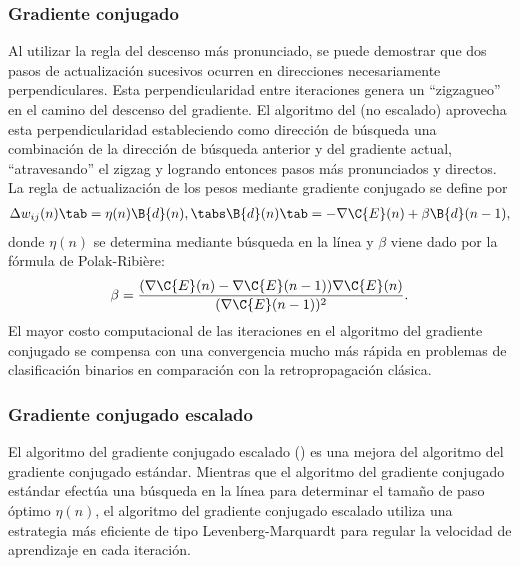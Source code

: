 \subsubsection{Gradiente conjugado}
%
Al utilizar la regla del descenso más pronunciado, se puede demostrar
que dos pasos de actualización sucesivos ocurren en direcciones
necesariamente perpendiculares.
Esta perpendicularidad entre iteraciones genera un ``zigzagueo'' en el
camino del descenso del gradiente. El algoritmo del  (no escalado) aprovecha esta perpendicularidad
estableciendo como dirección de búsqueda una combinación de la
dirección de búsqueda anterior y del gradiente actual, ``atravesando''
el zigzag y logrando entonces pasos más pronunciados y directos.
La regla de actualización de los pesos mediante gradiente conjugado
se define por
%
\begin{align}\label{e2:delta-rule-conjugate}
  \Delta w_{ij}(n)\tab=\eta(n)\B{d}(n),
  \tabs \B{d}(n)\tab=-\nabla{\C{E}(n)}+\beta\B{d}(n-1),
\end{align}
%
donde $\eta(n)$ se determina mediante búsqueda en la línea y $\beta$
viene dado por la fórmula de Polak-Ribière:
%
\begin{align}\label{e2:polak-ribiere}
  \beta=
  \frac{(\nabla{\C{E}(n)}-\nabla{\C{E}(n-1)})\nabla{\C{E}(n)}}{(\nabla{\C{E}(n-1)})^2}.
\end{align}
%
El mayor costo computacional de las iteraciones en el algoritmo del
gradiente conjugado se compensa con una convergencia mucho más rápida
en problemas de clasificación binarios en comparación con la
retropropagación clásica.
%
\subsubsection{Gradiente conjugado escalado}
%
El algoritmo del gradiente conjugado escalado () \cite{scg} es una mejora del algoritmo del gradiente
conjugado estándar. Mientras que el algoritmo del gradiente conjugado
estándar efectúa una búsqueda en la línea para determinar el tamaño de
paso óptimo $\eta(n)$, el algoritmo del gradiente conjugado escalado
utiliza una estrategia más eficiente de tipo Levenberg-Marquardt para
regular la velocidad de aprendizaje en cada iteración.

